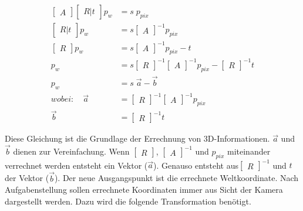 	\begin{equation}
	\begin{aligned}
	\begin{bmatrix} A \end{bmatrix} \begin{bmatrix} R|t \end{bmatrix} p_w &= s \; p_{pix} \\
	\begin{bmatrix} R|t \end{bmatrix} p_w &= s \begin{bmatrix} A \end{bmatrix}^{-1} p_{pix} \\
	\begin{bmatrix} R \end{bmatrix} p_w &= s \begin{bmatrix} A \end{bmatrix}^{-1} p_{pix} - t \\
	p_w &= s \begin{bmatrix} R \end{bmatrix}^{-1} \begin{bmatrix} A \end{bmatrix}^{-1} p_{pix} - \begin{bmatrix} R \end{bmatrix}^{-1} t \\
	p_w &= s \; \vec{a} - \vec{b} \\
	wobei: \quad \vec{a} & = \begin{bmatrix} R \end{bmatrix}^{-1} \begin{bmatrix} A \end{bmatrix}^{-1} p_{pix} \\
	\vec{b} &= \begin{bmatrix} R \end{bmatrix}^{-1} t
	\end{aligned}
	\label{eq:pixel_zu_welt}
	\end{equation}
	
	Diese Gleichung ist die Grundlage der Errechnung von 3D-Informationen. \( \vec{a} \) und \( \vec{b} \) dienen zur Vereinfachung. Wenn \( \begin{bmatrix} R \end{bmatrix} \), \( \begin{bmatrix} A \end{bmatrix}^{-1} \) und \( p_{pix} \) miteinander verrechnet werden entsteht ein Vektor (\( \vec{a} \)). Genauso entsteht aus\( \begin{bmatrix} R \end{bmatrix}^{-1} \) und \( t \) der Vektor (\( \vec{b} \)). \newline
	Der neue Ausgangspunkt ist die errechnete Weltkoordinate. Nach Aufgabenstellung sollen errechnete Koordinaten immer aus Sicht der Kamera dargestellt werden. Dazu wird die folgende Transformation benötigt. 
	
